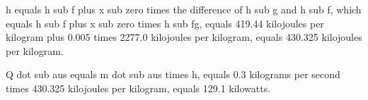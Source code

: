 h equals h sub f plus x sub zero times the difference of h sub g and h sub f, which equals h sub f plus x sub zero times h sub fg, equals 419.44 kilojoules per kilogram plus 0.005 times 2277.0 kilojoules per kilogram, equals 430.325 kilojoules per kilogram.

Q dot sub aus equals m dot sub aus times h, equals 0.3 kilograms per second times 430.325 kilojoules per kilogram, equals 129.1 kilowatts.